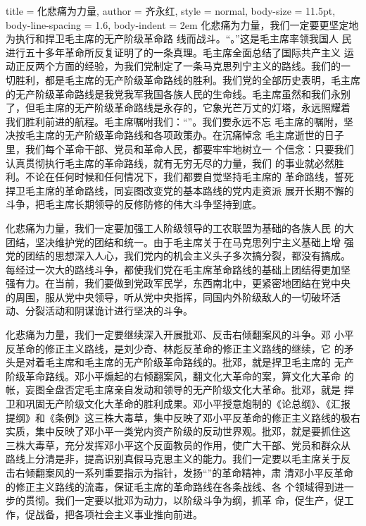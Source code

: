 \begin{hongqiarticle}{
        title  = {化悲痛为力量},
        author = {齐永红},
        style  = normal,
        body-size = 11.5pt,
        body-line-spacing = 1.6,
        body-indent = 2em
    }
    化悲痛为力量，我们一定要更坚定地为执行和捍卫毛主席的无产阶级革命路
    线而战斗。“。”这是毛主席率领我国人
    民进行五十多年革命所反复证明了的一条真理。毛主席全面总结了国际共产主义
    运动正反两个方面的经验，为我们党制定了一条马克思列宁主义的路线。我们的一
    切胜利，都是毛主席的无产阶级革命路线的胜利。我们党的全部历史表明，毛主席
    的无产阶级革命路线是我党我军我国各族人民的生命线。毛主席虽然和我们永别
    了，但毛主席的无产阶级革命路线是永存的，它象光芒万丈的灯塔，永远照耀着
    我们胜利前进的航程。毛主席嘱咐我们：“”。我们要永远不忘
    毛主席的嘱附，坚决按毛主席的无产阶级革命路线和各项政策办。在沉痛悼念
    毛主席逝世的日子里，我们每个革命干部、党员和革命人民，都要牢牢地树立一
    个信念：只要我们认真贯彻执行毛主席的革命路线，就有无穷无尽的力量，我们
    的事业就必然胜利。不论在任何时候和任何情况下，我们都要自觉坚持毛主席的
    革命路线，誓死捍卫毛主席的革命路线，同妄图改变党的基本路线的党内走资派
    展开长期不懈的斗争，把毛主席长期领导的反修防修的伟大斗争坚持到底。
    
    化悲痛为力量，我们一定要加强工人阶级领导的工农联盟为基础的各族人民
    的大团结，坚决维护党的团结和统一。由于毛主席关于在马克思列宁主义基础上增
    强党的团结的思想深入人心，我们党内的机会主义头子多次搞分裂，都没有搞成。
    每经过一次大的路线斗争，都使我们党在毛主席革命路线的基础上团结得更加坚
    强有力。在当前，我们要做到党政军民学，东西南北中，更紧密地团结在党中央
    的周围，服从党中央领导，听从党中央指挥，同国内外阶级敌人的一切破坏活
    动、分裂活动和阴谋诡计进行坚决的斗争。
    
    化悲痛为力量，我们一定要继续深入开展批邓、反击右倾翻案风的斗争。邓
    小平反革命的修正主义路线，是刘少奇、林彪反革命的修正主义路线的继续，它
    的矛头是对着毛主席和毛主席的无产阶级革命路线的。批邓，就是捍卫毛主席的
    无产阶级革命路线。邓小平煽起的右倾翻案风，翻文化大革命的案，算文化大革命
    的帐，妄图全盘否定毛主席亲自发动和领导的无产阶级文化大革命。批邓，就是
    捍卫和巩固无产阶级文化大革命的胜利成果。邓小平授意炮制的《论总纲》、《汇报
    提纲》和《条例》这三株大毒草，集中反映了邓小平反革命的修正主义路线的极右
    实质，集中反映了邓小平一类党内资产阶级的反动世界观。批邓，就是要抓住这
    三株大毒草，充分发挥邓小平这个反面教员的作用，使广大干部、党员和群众从
    路线上分清是非，提高识别真假马克思主义的能力。我们一定要以毛主席关于反
    击右倾翻案风的一系列重要指示为指针，发扬“”的革命精神，肃
    清邓小平反革命的修正主义路线的流毒，保证毛主席的革命路线在各条战线、各
    个领域得到进一步的贯彻。我们一定要以批邓为动力，以阶级斗争为纲，抓革
    命，促生产，促工作，促战备，把各项社会主义事业推向前进。
    

\end{hongqiarticle}
